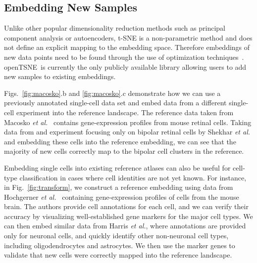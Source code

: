 \documentclass[twocolumn]{bmcart}
\newcommand{\opentsne}{\textsf{openTSNE}}
\begin{document}
\subsection*{Embedding New Samples}

Unlike other popular dimensionality reduction methods such as principal component analysis or autoencoders, t-SNE is a non-parametric method and does not define an explicit mapping to the embedding space. Therefore embeddings of new data points need to be found through the use of optimization techniques~\cite{policar2019embedding}. \opentsne\ is currently the only publicly available library allowing users to add new samples to existing embeddings.

Figs.~\ref{fig:macosko}.b and \ref{fig:macosko}.c demonstrate how we can use a previously annotated single-cell data set and embed data from a different single-cell experiment into the reference landscape. The reference data taken from Macosko \textit{et al.}~\cite{macosko2015highly} contains gene-expression profiles from mouse retinal cells. Taking data from and experiment focusing only on bipolar retinal cells by Shekhar \textit{et al.} and embedding these cells into the reference embedding, we can see that the majority of new cells correctly map to the bipolar cell clusters in the reference.

Embedding single cells into existing reference atlases can also be useful for cell-type classification in cases where cell identities are not yet known. For instance, in Fig.~\ref{fig:transform}, we construct a reference embedding using data from Hochgerner \textit{et al.}~\cite{hochgerner2018conserved} containing  gene-expression profiles of cells from the mouse brain. The authors provide cell annotations for each cell, and we can verify their accuracy by visualizing well-established gene markers for the major cell types. We can then embed similar data from Harris \textit{et al.}, where annotations are provided only for neuronal cells, and quickly identify other non-neuronal cell types, including oligodendrocytes and astrocytes. We then use the marker genes to validate that new cells were correctly mapped into the reference landscape.
\end{document}
